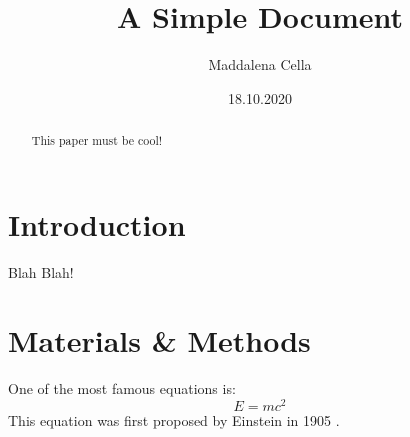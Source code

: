\documentclass[12pt]{article}
\title{A Simple Document}
\author{Maddalena Cella}
\date{18.10.2020}
\begin{document}
 
    \maketitle

    \begin{abstract}
        This paper must be cool!
    \end{abstract}

    \section{Introduction}
        Blah Blah!
    
    \section{Materials \& Methods}
    One of the most famous equations is: 
    \begin{equation}
        E = mc^2
    \end{equation}
    This equation was first proposed by Einstein in 1905 
    \cite{einstein1905does}.

    
     
\end{document}
